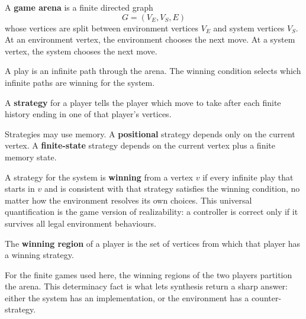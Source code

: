 \begin{definition}
\label{def:game-arena}
A \textbf{game arena} is a finite directed graph
\[
  G=(V_E,V_S,E)
\]
whose vertices are split between environment vertices $V_E$ and system
vertices $V_S$.  At an environment vertex, the environment chooses the
next move.  At a system vertex, the system chooses the next move.
\end{definition}

A play is an infinite path through the arena.  The winning condition
selects which infinite paths are winning for the system.

\begin{definition}[Strategy]
\label{def:strategy}
A \textbf{strategy} for a player tells the player which move to take
after each finite history ending in one of that player's vertices.
\end{definition}

Strategies may use memory.  A \textbf{positional} strategy depends only
on the current vertex.  A \textbf{finite-state} strategy depends on the
current vertex plus a finite memory state.


A strategy for the system is \textbf{winning} from a vertex $v$ if
every infinite play that starts in $v$ and is consistent with that
strategy satisfies the winning condition, no matter how the environment
resolves its own choices.  This universal quantification is the game
version of realizability: a controller is correct only if it survives
all legal environment behaviours.

\begin{definition}
\label{def:winning-region}
The \textbf{winning region} of a player is the set of vertices from
which that player has a winning strategy.
\end{definition}

For the finite games used here, the winning regions of the two players
partition the arena.  This determinacy fact is what lets synthesis
return a sharp answer: either the system has an implementation, or the
environment has a counter-strategy.

